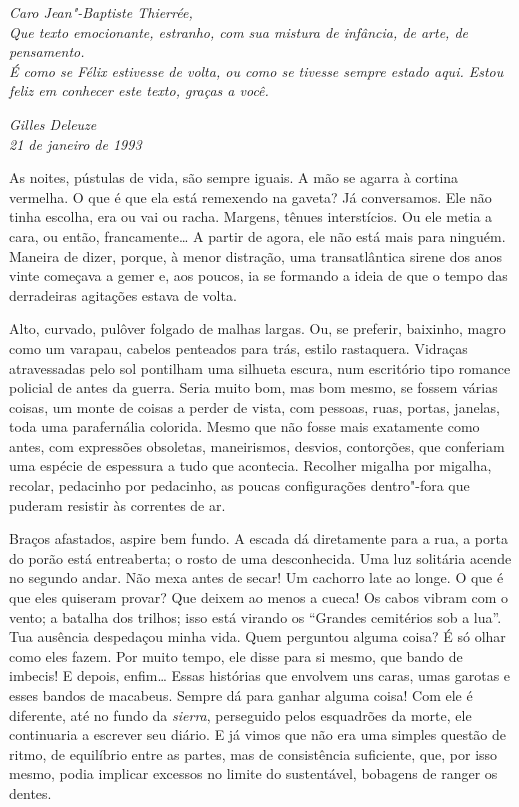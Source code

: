 \thispagestyle{empty}
\movetooddpage
\thispagestyle{empty}

\begin{vplace}[30]
\noindent\emph{Caro Jean"-Baptiste Thierrée,\\[8pt]
Que texto emocionante, estranho, com sua mistura de infância, de arte,
de pensamento.\\
É como se Félix estivesse de volta, ou como se tivesse sempre estado
aqui. Estou feliz em conhecer este texto, graças a você.}\\
\begin{flushright}
\emph{Gilles Deleuze\\
21 de janeiro de 1993}
\end{flushright}
\end{vplace}

\paginabranca
\pagebreak
\movetooddpage

As noites, pústulas de vida, são sempre iguais. A mão se agarra à
cortina vermelha. O que é que ela está remexendo na gaveta? Já
conversamos. Ele não tinha escolha, era ou vai ou racha. Margens, tênues
interstícios. Ou ele metia a cara, ou então, francamente\ldots{} A partir de
agora, ele não está mais para ninguém. Maneira de dizer, porque, à menor
distração, uma transatlântica sirene dos anos vinte começava a gemer e,
aos poucos, ia se formando a ideia de que o tempo das derradeiras
agitações estava de volta.

Alto, curvado, pulôver folgado de malhas largas. Ou, se preferir,
baixinho, magro como um varapau, cabelos penteados para trás, estilo
rastaquera. Vidraças atravessadas pelo sol pontilham uma silhueta
escura, num escritório tipo romance policial de antes da guerra. Seria
muito bom, mas bom mesmo, se fossem várias coisas, um monte de coisas a
perder de vista, com pessoas, ruas, portas, janelas, toda uma
parafernália colorida. Mesmo que não fosse mais exatamente como antes,
com expressões obsoletas, maneirismos, desvios, contorções, que
conferiam uma espécie de espessura a tudo que acontecia. Recolher
migalha por migalha, recolar, pedacinho por pedacinho, as poucas
configurações dentro"-fora que puderam resistir às correntes de ar.

Braços afastados, aspire bem fundo. A escada dá diretamente para a rua,
a porta do porão está entreaberta; o rosto de uma desconhecida. Uma luz
solitária acende no segundo andar. Não mexa antes de secar! Um cachorro
late ao longe. O que é que eles quiseram provar? Que deixem ao menos a
cueca! Os cabos vibram com o vento; a batalha dos trilhos; isso está
virando os ``Grandes cemitérios sob a lua''. Tua ausência despedaçou
minha vida. Quem perguntou alguma coisa? É só olhar como eles fazem. Por
muito tempo, ele disse para si mesmo, que bando de imbecis! E depois,
enfim\ldots{} Essas histórias que envolvem uns caras, umas garotas e esses
bandos de macabeus. Sempre dá para ganhar alguma coisa! Com ele é
diferente, até no fundo da \emph{sierra}, perseguido pelos esquadrões da
morte, ele continuaria a escrever seu diário. E já vimos que não era uma
simples questão de ritmo, de equilíbrio entre as partes, mas de
consistência suficiente, que, por isso mesmo, podia implicar excessos no
limite do sustentável, bobagens de ranger os dentes.

